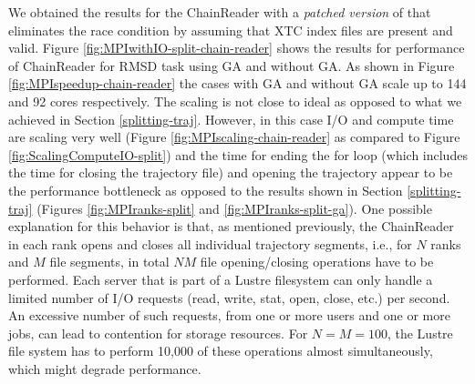 We obtained the results for the ChainReader with a \emph{patched version} of  that eliminates the race condition by assuming that XTC index files are present and valid. 
Figure \ref{fig:MPIwithIO-split-chain-reader} shows the results for performance of ChainReader for RMSD task using GA and without GA. 
As shown in Figure \ref{fig:MPIspeedup-chain-reader} the cases with GA and without GA scale up to 144 and 92 cores respectively.
The scaling is not close to ideal as opposed to what we achieved in Section \ref{splitting-traj}. 
However, in this case I/O and compute time are scaling very well (Figure \ref{fig:MPIscaling-chain-reader} as compared to Figure \ref{fig:ScalingComputeIO-split}) and the time for ending the for loop  (which includes the time for closing the trajectory file) and opening the trajectory  appear to be the performance bottleneck as opposed to the results shown in Section \ref{splitting-traj} (Figures \ref{fig:MPIranks-split} and \ref{fig:MPIranks-split-ga}). 
One possible explanation for this behavior is that, as mentioned previously, the ChainReader in each rank opens and closes all individual trajectory segments, i.e., for $N$ ranks and $M$ file segments, in total $N M$ file opening/closing operations have to be performed. 
Each server that is part of a Lustre filesystem can only handle a limited number of I/O requests (read, write, stat, open, close, etc.) per second.
An excessive number of such requests, from one or more users and one or more jobs, can lead to contention for storage resources. 
For $N=M=100$, the Lustre file system has to perform 10,000 of these operations almost simultaneously, which might degrade performance. 
 

